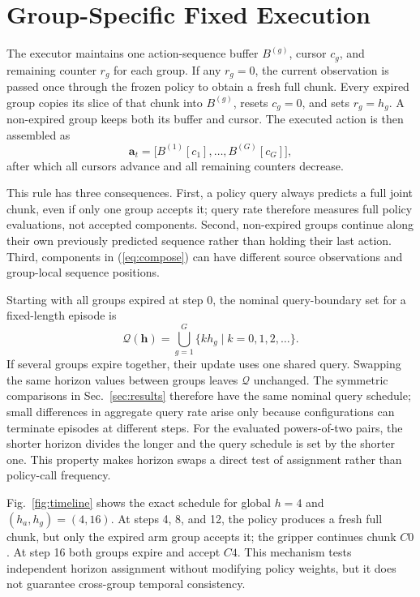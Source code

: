 \section{Group-Specific Fixed Execution}
\label{sec:execution}

The executor maintains one action-sequence buffer $B^{(g)}$, cursor $c_g$, and
remaining counter $r_g$ for each group.  If any $r_g=0$, the current observation
is passed once through the frozen policy to obtain a fresh full chunk.  Every
expired group copies its slice of that chunk into $B^{(g)}$, resets $c_g=0$, and
sets $r_g=h_g$.  A non-expired group keeps both its buffer and cursor.  The
executed action is then assembled as
\begin{equation}
\mathbf a_t=
\bigl[B^{(1)}[c_1],\ldots,B^{(G)}[c_G]\bigr],
\label{eq:compose}
\end{equation}
after which all cursors advance and all remaining counters decrease.

This rule has three consequences.  First, a policy query always predicts a full
joint chunk, even if only one group accepts it; query rate therefore measures
full policy evaluations, not accepted components.  Second, non-expired groups
continue along their own previously predicted sequence rather than holding their
last action.  Third, components in (\ref{eq:compose}) can have different source
observations and group-local sequence positions.

Starting with all groups expired at step 0, the nominal query-boundary set for a
fixed-length episode is
\begin{equation}
\mathcal Q(\mathbf h)=
\bigcup_{g=1}^{G}\{k h_g\mid k=0,1,2,\ldots\}.
\label{eq:query_set}
\end{equation}
If several groups expire together, their update uses one shared query.  Swapping
the same horizon values between groups leaves $\mathcal Q$ unchanged.  The
symmetric comparisons in Sec.~\ref{sec:results} therefore have the same nominal
query schedule; small differences in aggregate query rate arise only because
configurations can terminate episodes at different steps.  For the evaluated
powers-of-two pairs, the shorter horizon divides the longer and the query
schedule is set by the shorter one.  This property makes horizon swaps a direct
test of assignment rather than policy-call frequency.

Fig.~\ref{fig:timeline} shows the exact schedule for global $h=4$ and
$(h_a,h_g)=(4,16)$.  At steps 4, 8, and 12, the policy produces a fresh full
chunk, but only the expired arm group accepts it; the gripper continues chunk
$C0$.  At step 16 both groups expire and accept $C4$.  This mechanism tests
independent horizon assignment without modifying policy weights, but it does not
guarantee cross-group temporal consistency.

